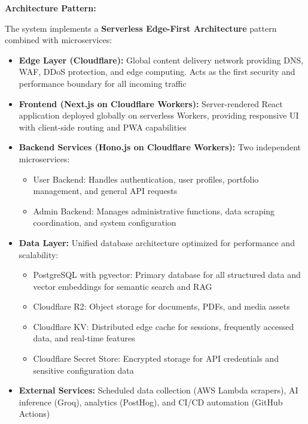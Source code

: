 \documentclass[12pt,a4paper]{report}
\begin{document}

\textbf{Architecture Pattern:}

The system implements a \textbf{Serverless Edge-First Architecture} pattern combined with microservices:

\begin{itemize}
    \item \textbf{Edge Layer (Cloudflare):} Global content delivery network providing DNS, WAF, DDoS protection, and edge computing. Acts as the first security and performance boundary for all incoming traffic
    \item \textbf{Frontend (Next.js on Cloudflare Workers):} Server-rendered React application deployed globally on serverless Workers, providing responsive UI with client-side routing and PWA capabilities
    \item \textbf{Backend Services (Hono.js on Cloudflare Workers):} Two independent microservices:
    \begin{itemize}
        \item User Backend: Handles authentication, user profiles, portfolio management, and general API requests
        \item Admin Backend: Manages administrative functions, data scraping coordination, and system configuration
    \end{itemize}
    \item \textbf{Data Layer:} Unified database architecture optimized for performance and scalability:
    \begin{itemize}
        \item PostgreSQL with pgvector: Primary database for all structured data and vector embeddings for semantic search and RAG
        \item Cloudflare R2: Object storage for documents, PDFs, and media assets
        \item Cloudflare KV: Distributed edge cache for sessions, frequently accessed data, and real-time features
        \item Cloudflare Secret Store: Encrypted storage for API credentials and sensitive configuration data
    \end{itemize}
    \item \textbf{External Services:} Scheduled data collection (AWS Lambda scrapers), AI inference (Groq), analytics (PostHog), and CI/CD automation (GitHub Actions)
\end{itemize}
\end{document}
